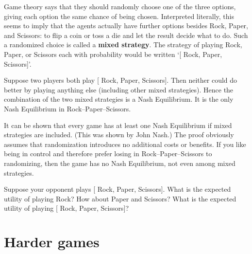 Game theory says that they should randomly choose one of the three
options, giving each option the same chance of being chosen.
Interpreted literally, this seems to imply that the agents actually
have further options besides Rock, Paper, and Scissors: to flip a
coin or toss a die and let the result decide what to do. Such a
randomized choice is called a \textbf{mixed strategy}. The strategy of
playing Rock, Paper, or Scissors each with probability 
would be written `[ Rock,  Paper,
 Scissors]'.

Suppose two players both play [ Rock, 
Paper,  Scissors]. Then neither could do better by
playing anything else (including other mixed strategies). Hence the
combination of the two mixed strategies is a Nash Equilibrium. It is
the only Nash Equilibrium in Rock--Paper--Scissors.

It can be shown that every game has at least one Nash Equilibrium if
mixed strategies are included. (This was shown by John Nash.) The
proof obviously assumes that randomization introduces no additional
costs or benefits. If you like being in control and therefore prefer
losing in Rock--Paper--Scissors to randomizing, then the game has no
Nash Equilibrium, not even among mixed strategies.

\begin{exercise2}
  Suppose your opponent plays [ Rock, 
  Paper,  Scissors]. What is the expected utility of
  playing Rock? How about Paper and Scissors? What is the expected
  utility of playing [ Rock, 
  Paper,  Scissors]? 
\end{exercise2}

\section{Harder games}

